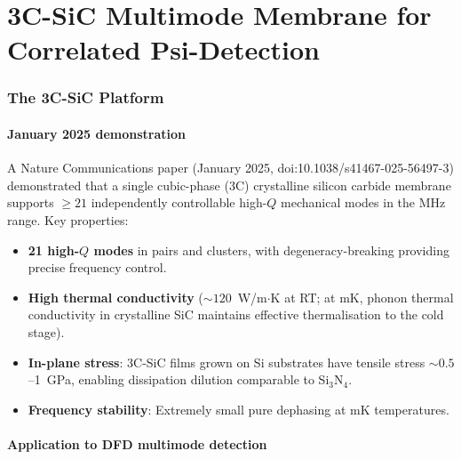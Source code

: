 \documentclass[11pt]{article}
\theoremstyle{definition}
\theoremstyle{remark}
\begin{document}
\part{3C-SiC Multimode Membrane for Correlated Psi-Detection}
\label{part:SiC}


\section{The 3C-SiC Platform}
\label{sec:SiC}

\subsection{January 2025 demonstration}

A Nature Communications paper (January 2025,
doi:10.1038/s41467-025-56497-3) demonstrated that a single
cubic-phase (3C) crystalline silicon carbide membrane supports
$\geq 21$ independently controllable high-$Q$ mechanical modes
in the MHz range. Key properties:

\begin{itemize}[nosep]
\item \textbf{21 high-$Q$ modes} in pairs and clusters, with
  degeneracy-breaking providing precise frequency control.
\item \textbf{High thermal conductivity} ($\sim 120$~W/m$\cdot$K
  at RT; at mK, phonon thermal conductivity in crystalline SiC
  maintains effective thermalisation to the cold stage).
\item \textbf{In-plane stress}: 3C-SiC films grown on Si substrates
  have tensile stress $\sim 0.5$--1~GPa, enabling dissipation
  dilution comparable to Si$_3$N$_4$.
\item \textbf{Frequency stability}: Extremely small pure dephasing
  at mK temperatures.
\end{itemize}

\subsection{Application to DFD multimode detection}
\end{document}
